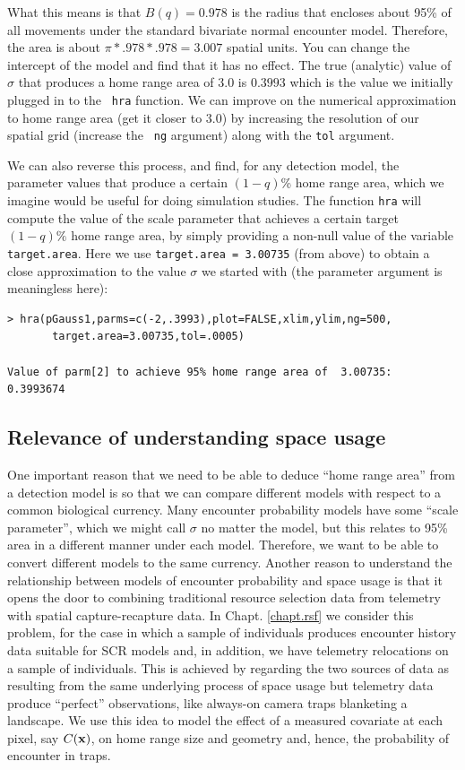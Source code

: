 What this means is that $B(q) = 0.978$ is the radius that
encloses about 95\% of all movements under the standard bivariate
normal encounter model.  Therefore, the area is about $\pi*.978*.978 =
3.007$ spatial units.  You can change the intercept of the model and
find that it has no effect.
The
true (analytic)
 value of $\sigma$ that produces a home range area of 3.0 is
$0.3993$ which is the value we initially plugged in to the \mbox{\tt
  hra} function. We can improve on the numerical approximation to home range
area (get it closer to $3.0$) by increasing
the resolution of our spatial grid (increase the \mbox{\tt
  ng} argument) along with the \mbox{\tt tol} argument.

We can also reverse this process, and find, for any detection model,
the parameter values that produce a certain $(1-q)$\% home range
area, which we imagine would be useful for doing simulation studies.
The function \mbox{\tt hra} will compute the value of the scale parameter
that achieves a certain target $(1-q)\%$ home range area, by
simply providing a non-null value of the variable \mbox{\tt
  target.area}. Here we use \mbox{\tt target.area = 3.00735} (from
above) to obtain a close approximation to the value $\sigma$ we
started with (the parameter argument is meaningless here):
{\small
\begin{verbatim}
> hra(pGauss1,parms=c(-2,.3993),plot=FALSE,xlim,ylim,ng=500,
       target.area=3.00735,tol=.0005)

Value of parm[2] to achieve 95% home range area of  3.00735:  0.3993674
\end{verbatim}
}

\subsection{Relevance of understanding space usage}

One important reason that we need to be able to deduce ``home range
area'' from a detection model is so that we can compare different
models with respect to a common biological currency.
Many encounter probability models have some ``scale parameter'', which
we might call $\sigma$ no matter the model, but this
relates to 95\% area in a different manner under each model.
Therefore, we want to be able to convert different models to the
same currency.
Another reason to understand the relationship between models of
encounter probability and space usage is that it opens the door to
combining traditional resource selection data from telemetry with
spatial capture-recapture data.  In Chapt. \ref{chapt.rsf} we consider
this problem, for the case in which a sample of individuals produces
encounter history data suitable for SCR models and, in addition, we
have telemetry relocations on a sample of individuals. This is
achieved by regarding the two sources of data as resulting from the
same underlying process of space usage but telemetry data produce
``perfect'' observations, like always-on camera traps blanketing a
landscape.  We use this idea to model the effect of a measured
covariate at each pixel, say $C({\bf x})$, on home range size and geometry
and, hence, the probability of encounter in traps.



